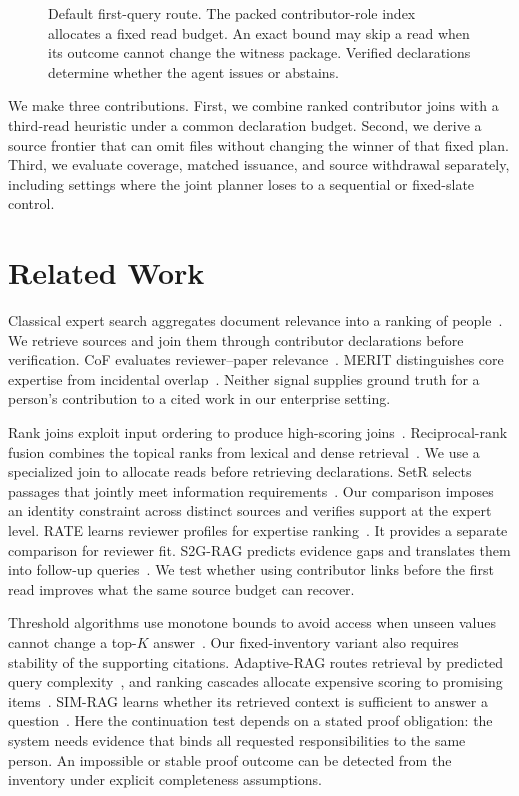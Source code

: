 \documentclass[sigconf,natbib=true,anonymous=true,pbalance=true]{acmart}
\begin{document}
\begin{figure}[t]
\centering

\caption{Default first-query route. The packed contributor-role index allocates a fixed read budget. An exact bound may skip a read when its outcome cannot change the witness package. Verified declarations determine whether the agent issues or abstains.}
\label{fig:plan}
\end{figure}

We make three contributions. First, we combine ranked contributor joins with a third-read heuristic under a common declaration budget. Second, we derive a source frontier that can omit files without changing the winner of that fixed plan. Third, we evaluate coverage, matched issuance, and source withdrawal separately, including settings where the joint planner loses to a sequential or fixed-slate control.

\section{Related Work}
Classical expert search aggregates document relevance into a ranking of people~\cite{balog2006formal}. We retrieve sources and join them through contributor declarations before verification. CoF evaluates reviewer--paper relevance~\cite{zhang2025cof}. MERIT distinguishes core expertise from incidental overlap~\cite{yang2026merit}. Neither signal supplies ground truth for a person's contribution to a cited work in our enterprise setting.

Rank joins exploit input ordering to produce high-scoring joins~\cite{ilyas2003rankjoin}. Reciprocal-rank fusion combines the topical ranks from lexical and dense retrieval~\cite{cormack2009rrf}. We use a specialized join to allocate reads before retrieving declarations. SetR selects passages that jointly meet information requirements~\cite{lee2025setr}. Our comparison imposes an identity constraint across distinct sources and verifies support at the expert level. RATE learns reviewer profiles for expertise ranking~\cite{liu2026rate}. It provides a separate comparison for reviewer fit. S2G-RAG predicts evidence gaps and translates them into follow-up queries~\cite{li2026s2g}. We test whether using contributor links before the first read improves what the same source budget can recover.

Threshold algorithms use monotone bounds to avoid access when unseen values cannot change a top-$K$ answer~\cite{fagin2001aggregation,broder2003wand}. Our fixed-inventory variant also requires stability of the supporting citations. Adaptive-RAG routes retrieval by predicted query complexity~\cite{jeong2024adaptive}, and ranking cascades allocate expensive scoring to promising items~\cite{wang2011cascade,hofstatter2021intradocument}. SIM-RAG learns whether its retrieved context is sufficient to answer a question~\cite{yang2025simrag}. Here the continuation test depends on a stated proof obligation: the system needs evidence that binds all requested responsibilities to the same person. An impossible or stable proof outcome can be detected from the inventory under explicit completeness assumptions.
\end{document}
